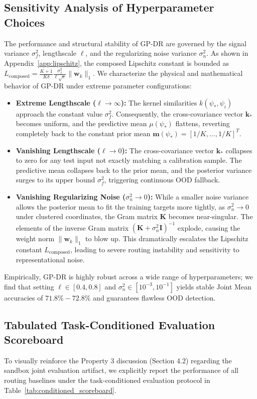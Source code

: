 \documentclass{article}
\theoremstyle{plain}
\theoremstyle{definition}
\theoremstyle{remark}
\begin{document}
\subsection{Sensitivity Analysis of Hyperparameter Choices}
The performance and structural stability of GP-DR are governed by the signal variance $\sigma_f^2$, lengthscale $\ell$, and the regularizing noise variance $\sigma_n^2$.
As shown in Appendix~\ref{app:lipschitz}, the composed Lipschitz constant is bounded as $L_{\text{composed}} = \frac{K+1}{K \delta} \frac{\sigma_f^2}{\ell \sqrt{e}} \|\mathbf{w}_k\|_1$.
We characterize the physical and mathematical behavior of GP-DR under extreme parameter configurations:
\begin{itemize}
    \item \textbf{Extreme Lengthscale ($\ell \to \infty$):} The kernel similarities $k(\psi_*, \psi_i)$ approach the constant value $\sigma_f^2$. Consequently, the cross-covariance vector $\mathbf{k}_*$ becomes uniform, and the predictive mean $\mu(\psi_*)$ flattens, reverting completely back to the constant prior mean $\mathbf{m}(\psi_*) = [1/K, \dots, 1/K]^T$.
    \item \textbf{Vanishing Lengthscale ($\ell \to 0$):} The cross-covariance vector $\mathbf{k}_*$ collapses to zero for any test input not exactly matching a calibration sample. The predictive mean collapses back to the prior mean, and the posterior variance surges to its upper bound $\sigma_f^2$, triggering continuous OOD fallback.
    \item \textbf{Vanishing Regularizing Noise ($\sigma_n^2 \to 0$):} While a smaller noise variance allows the posterior mean to fit the training targets more tightly, as $\sigma_n^2 \to 0$ under clustered coordinates, the Gram matrix $\mathbf{K}$ becomes near-singular. The elements of the inverse Gram matrix $(\mathbf{K} + \sigma_n^2 \mathbf{I})^{-1}$ explode, causing the weight norm $\|\mathbf{w}_k\|_1$ to blow up. This dramatically escalates the Lipschitz constant $L_{\text{composed}}$, leading to severe routing instability and sensitivity to representational noise.
\end{itemize}
Empirically, GP-DR is highly robust across a wide range of hyperparameters; we find that setting $\ell \in [0.4, 0.8]$ and $\sigma_n^2 \in [10^{-3}, 10^{-1}]$ yields stable Joint Mean accuracies of $71.8\% - 72.8\%$ and guarantees flawless OOD detection.

\subsection{Tabulated Task-Conditioned Evaluation Scoreboard}
To visually reinforce the Property 3 discussion (Section 4.2) regarding the sandbox joint evaluation artifact, we explicitly report the performance of all routing baselines under the task-conditioned evaluation protocol in Table~\ref{tab:conditioned_scoreboard}.
\end{document}
